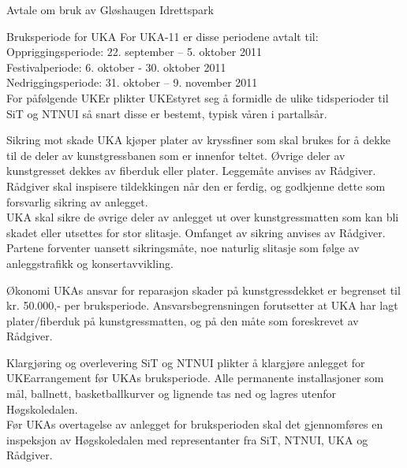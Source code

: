 \begin{instruks*}{Avtale om bruk av Gløshaugen Idrettspark}
\begin{instruksledd}{Bruksperiode for UKA}
For UKA-11 er disse periodene avtalt til:\\

Oppriggingsperiode: 	22. september – 5. oktober 2011\\
Festivalperiode: 	6. oktober - 30. oktober 2011\\
Nedriggingsperiode:	31. oktober – 9. november 2011\\

For påfølgende UKEr plikter UKEstyret seg å formidle de ulike tidsperioder til SiT og NTNUI så snart disse er bestemt, typisk våren i partallsår.
\end{instruksledd}

\begin{instruksledd}{Sikring mot skade}
UKA kjøper plater av kryssfiner som skal brukes for å dekke til de deler av kunstgressbanen som er innenfor teltet.  Øvrige deler av kunstgresset dekkes av fiberduk eller plater.  Leggemåte anvises av Rådgiver. Rådgiver skal inspisere tildekkingen når den er ferdig, og godkjenne dette som forsvarlig sikring av anlegget.\\  

UKA skal sikre de øvrige deler av anlegget ut over kunstgressmatten som kan bli skadet eller utsettes for stor slitasje. Omfanget av sikring anvises av Rådgiver. \\
 
Partene forventer uansett sikringsmåte, noe naturlig slitasje som følge av anleggstrafikk og konsertavvikling.\\
\end{instruksledd}
 
\begin{instruksledd}{Økonomi}
UKAs ansvar for reparasjon skader på kunstgressdekket er begrenset til kr. 50.000,- per bruksperiode.  Ansvarsbegrensningen forutsetter at UKA har lagt plater/fiberduk på kunstgressmatten, og på den måte som foreskrevet av Rådgiver.\\
\end{instruksledd}
  

\begin{instruksledd}{Klargjøring og overlevering}
SiT og NTNUI plikter å klargjøre anlegget for UKEarrangement før UKAs bruksperiode. Alle permanente installasjoner som mål, ballnett, basketballkurver og lignende tas ned og lagres utenfor Høgskoledalen.\\

Før UKAs overtagelse av anlegget for bruksperioden skal det gjennomføres en inspeksjon av Høgskoledalen med representanter fra SiT, NTNUI, UKA og Rådgiver. \\


\end{instruksledd}
\end{instruks*}
